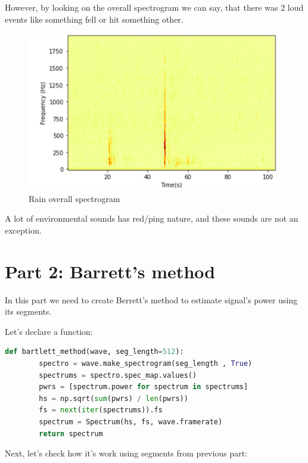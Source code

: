 \documentclass[a4paper]{article}
\begin{document}
        However, by looking on the overall spectrogram we can say, that there was 2 loud events like something fell or hit something other.
        \begin{figure}[H]
            \centering
            \includegraphics[width=\textwidth]{img/rain_spectrogram.png}
            \caption{Rain overall spectrogram}
            \label{fig:part1_2_5}
        \end{figure}
    
        A lot of environmental sounds has red/ping nature, and these sounds are not an exception.
    
    \newpage
        \section{Part 2: Barrett's method}

        In this part we need to create Berrett's method to estimate signal's power using its segments.
        
        Let's declare a function:
            
        \begin{lstlisting}[language=Python,caption={Barrett's function definition},label={lst:sawtooth_def}]
    def bartlett_method(wave, seg_length=512):
        spectro = wave.make_spectrogram(seg_length , True)
        spectrums = spectro.spec_map.values()
        pwrs = [spectrum.power for spectrum in spectrums]
        hs = np.sqrt(sum(pwrs) / len(pwrs))
        fs = next(iter(spectrums)).fs
        spectrum = Spectrum(hs, fs, wave.framerate)
        return spectrum
        \end{lstlisting}
        
        Next, let's check how it's work using segments from previous part:
            
\end{document}
